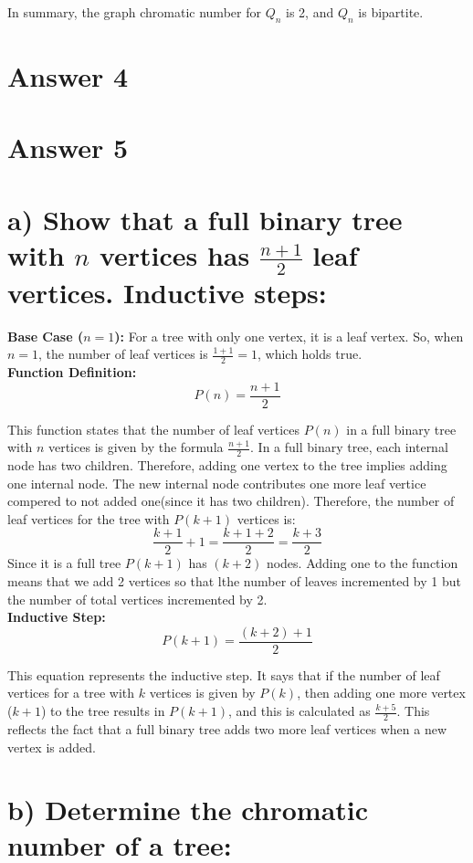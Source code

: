 \documentclass[12pt]{article}
\begin{document}
In summary, the graph chromatic number for \(Q_n\) is 2, and \(Q_n\) is bipartite.


\section*{Answer 4}

\section*{Answer 5}




\section*{a) Show that a full binary tree with $n$ vertices has $\frac{n+1}{2}$ leaf vertices. Inductive steps:}

\textbf{Base Case ($n = 1$):}
For a tree with only one vertex, it is a leaf vertex. So, when $n = 1$, the number of leaf vertices is $\frac{1+1}{2} = 1$, which holds true.\\
\textbf{Function Definition:}
\[ P(n) = \frac{n + 1}{2} \]

This function states that the number of leaf vertices $P(n)$ in a full binary tree with $n$ vertices is given by the formula $\frac{n + 1}{2}$.
In a full binary tree, each internal node has two children. Therefore, adding one vertex to the tree implies adding one internal node. The new internal node contributes one more leaf vertice compered to not added one(since it has two children).
Therefore, the number of leaf vertices for the tree with $P(k + 1) $ vertices is:
\[
\frac{k + 1}{2} + 1 = \frac{k + 1 + 2}{2} = \frac{k + 3}{2}
\]
Since it is a full tree $P(k + 1) $ has $(k + 2)$ nodes. Adding one to the function means that we add 2 vertices so that lthe number of leaves incremented by 1 but the number of total vertices incremented by 2. \\
\textbf{Inductive Step:}
\[ P(k + 1) = \frac{(k + 2) + 1}{2} \]

This equation represents the inductive step. It says that if the number of leaf vertices for a tree with $k$ vertices is given by $P(k)$, then adding one more vertex ($k + 1$) to the tree results in $P(k + 1)$, and this is calculated as $\frac{k + 5}{2}$. This reflects the fact that a full binary tree adds two more leaf vertices when a new vertex is added.

\section*{b) Determine the chromatic number of a tree:}
\end{document}

